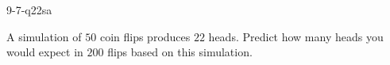 \begin{practiceQuestion}{9-7-q22}{sa}
\begin{questionText}
A simulation of $50$ coin flips produces $22$ heads. Predict how many heads you would expect in $200$ flips based on this simulation.
\end{questionText}
\end{practiceQuestion}
